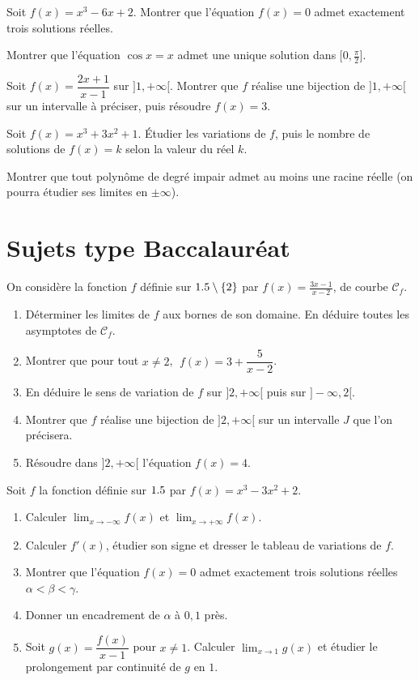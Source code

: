 \exo{} Soit $f(x)=x^{3}-6x+2$. Montrer que l'équation $f(x)=0$ admet exactement trois solutions réelles.

\exo{} Montrer que l'équation $\cos x=x$ admet une unique solution dans $\big[0,\tfrac{\pi}{2}\big]$.

\exo{} Soit $f(x)=\dfrac{2x+1}{x-1}$ sur $]1,+\infty[$. Montrer que $f$ réalise une bijection de $]1,+\infty[$ sur un intervalle à préciser, puis résoudre $f(x)=3$.

\exo{} Soit $f(x)=x^{3}+3x^{2}+1$. Étudier les variations de $f$, puis le nombre de solutions de $f(x)=k$ selon la valeur du réel $k$.

\exo{} Montrer que tout polynôme de degré impair admet au moins une racine réelle (on pourra étudier ses limites en $\pm\infty$).

\section{Sujets type Baccalauréat}

On considère la fonction $f$ définie sur $1.5\setminus\{2\}$ par $\displaystyle f(x)=\frac{3x-1}{x-2}$, de courbe $\mathcal C_f$.
\begin{enumerate}[label=\arabic*)]
\item Déterminer les limites de $f$ aux bornes de son domaine. En déduire toutes les asymptotes de $\mathcal C_f$.
\item Montrer que pour tout $x\neq2$, $\;f(x)=3+\dfrac{5}{x-2}$.
\item En déduire le sens de variation de $f$ sur $]2,+\infty[$ puis sur $]-\infty,2[$.
\item Montrer que $f$ réalise une bijection de $]2,+\infty[$ sur un intervalle $J$ que l'on précisera.
\item Résoudre dans $]2,+\infty[$ l'équation $f(x)=4$.
\end{enumerate}

Soit $f$ la fonction définie sur $1.5$ par $\displaystyle f(x)=x^{3}-3x^{2}+2$.
\begin{enumerate}[label=\arabic*)]
\item Calculer $\displaystyle\lim_{x\to-\infty}f(x)$ et $\displaystyle\lim_{x\to+\infty}f(x)$.
\item Calculer $f'(x)$, étudier son signe et dresser le tableau de variations de $f$.
\item Montrer que l'équation $f(x)=0$ admet exactement trois solutions réelles $\alpha<\beta<\gamma$.
\item Donner un encadrement de $\alpha$ à $0{,}1$ près.
\item Soit $g(x)=\dfrac{f(x)}{x-1}$ pour $x\neq1$. Calculer $\displaystyle\lim_{x\to1}g(x)$ et étudier le prolongement par continuité de $g$ en $1$.
\end{enumerate}

